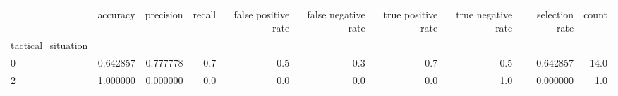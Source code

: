 \begin{tabular}{lrrrrrrrrr}
\toprule
{} &  accuracy &  precision &  recall &  false positive rate &  false negative rate &  true positive rate &  true negative rate &  selection rate &  count \\
tactical\_situation &           &            &         &                      &                      &                     &                     &                 &        \\
\midrule
0                  &  0.642857 &   0.777778 &     0.7 &                  0.5 &                  0.3 &                 0.7 &                 0.5 &        0.642857 &   14.0 \\
2                  &  1.000000 &   0.000000 &     0.0 &                  0.0 &                  0.0 &                 0.0 &                 1.0 &        0.000000 &    1.0 \\
\bottomrule
\end{tabular}

